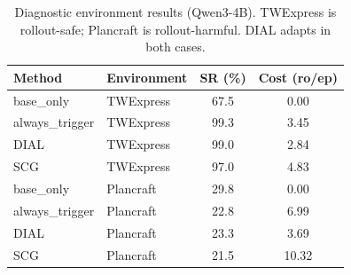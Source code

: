 \begin{table}[t]
\centering
\caption{Diagnostic environment results (Qwen3-4B). TWExpress is rollout-safe;
Plancraft is rollout-harmful. DIAL adapts in both cases.}
\label{tab:diagnostic}
\begin{tabular}{llcc}
\toprule
\textbf{Method} & \textbf{Environment} & \textbf{SR (\%)} & \textbf{Cost (ro/ep)} \\
\midrule
base\_only        & TWExpress  & 67.5 & 0.00 \\
always\_trigger   & TWExpress  & 99.3 & 3.45 \\
DIAL              & TWExpress  & 99.0 & 2.84 \\
SCG               & TWExpress  & 97.0 & 4.83 \\
\midrule
base\_only        & Plancraft  & 29.8 & 0.00 \\
always\_trigger   & Plancraft  & 22.8 & 6.99 \\
DIAL              & Plancraft  & 23.3 & 3.69 \\
SCG               & Plancraft  & 21.5 & 10.32 \\
\bottomrule
\end{tabular}
\end{table}
